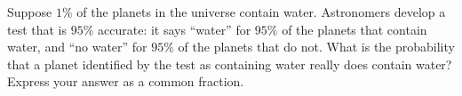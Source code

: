 Suppose $1\%$ of the planets in the universe contain water. Astronomers develop a test that is $95\%$ accurate: it says ``water'' for $95\%$ of the planets that contain water, and ``no water'' for $95\%$ of the planets that do not. What is the probability that a planet identified by the test as containing water really does contain water? Express your answer as a common fraction.
